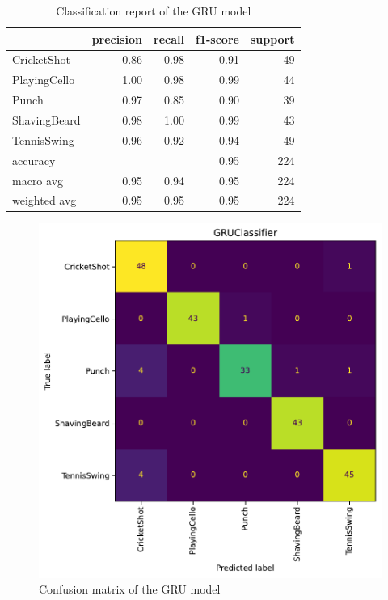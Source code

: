 \documentclass{article}
\begin{document}
\begin{table}[h]
    \label{clfrep:gru}
    \centering
    \begin{tabular}{lrrrr}
        \toprule
        & precision & recall & f1-score & support \\
        \midrule
        CricketShot & 0.86 & 0.98 & 0.91 & 49 \\
        PlayingCello & 1.00 & 0.98 & 0.99 & 44 \\
        Punch & 0.97 & 0.85 & 0.90 & 39 \\
        ShavingBeard & 0.98 & 1.00 & 0.99 & 43 \\
        TennisSwing & 0.96 & 0.92 & 0.94 & 49 \\
        \midrule
        accuracy &  &  & 0.95 & 224 \\
        macro avg & 0.95 & 0.94 & 0.95 & 224 \\
        weighted avg & 0.95 & 0.95 & 0.95 & 224 \\
        \bottomrule
    \end{tabular}
    \caption{Classification report of the GRU model}
\end{table}

\begin{figure}[h]
    \label{fig:confmat_gru}
    \centering
    \includegraphics[scale=0.5]{./confusion_matrix_gru.pdf}
    \caption{Confusion matrix of the GRU model}
\end{figure}
\end{document}
